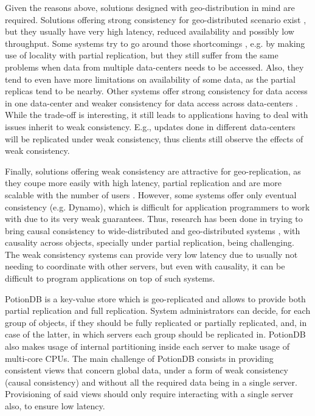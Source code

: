 
Given the reasons above, solutions designed with geo-distribution in mind are required.
Solutions offering strong consistency for geo-distributed scenario exist \cite{mdcc, slog}, but they usually have very high latency, reduced availability and possibly low throughput.
Some systems try to go around those shortcomings \cite{mdcc, chronocache, slog, walter}, e.g. by making use of locality with partial replication, but they still suffer from the same problems when data from multiple data-centers needs to be accessed.
Also, they tend to even have more limitations on availability of some data, as the partial replicas tend to be nearby.
Other systems offer strong consistency for data access in one data-center and weaker consistency for data access across data-centers \cite{cops, eiger, walter}.
While the trade-off is interesting, it still leads to applications having to deal with issues inherit to weak consistency. E.g., updates done in different data-centers will be replicated under weak consistency, thus clients still observe the effects of weak consistency.

Finally, solutions offering weak consistency are attractive for geo-replication, as they coupe more easily with high latency, partial replication and are more scalable with the number of users \cite{eiger, cure, walter}.
However, some systems offer only eventual consistency (e.g. Dynamo), which is difficult for application programmers to work with due to its very weak guarantees.
Thus, research has been done in trying to bring causal consistency to wide-distributed and geo-distributed systems \cite{cops, eiger, saturn, cure, walter}, with causality across objects, specially under partial replication, being challenging.
The weak consistency systems can provide very low latency due to usually not needing to coordinate with other servers, but even with causality, it can be difficult to program applications on top of such systems. %


PotionDB is a key-value store which is geo-replicated and allows to provide both partial replication and full replication.
System administrators can decide, for each group of objects, if they should be fully replicated or partially replicated, and, in case of the latter, in which servers each group should be replicated in.
PotionDB also makes usage of internal partitioning inside each server to make usage of multi-core CPUs.
The main challenge of PotionDB consists in providing consistent views that concern global data, under a form of weak consistency (causal consistency) and without all the required data being in a single server.
Provisioning of said views should only require interacting with a single server also, to ensure low latency.

